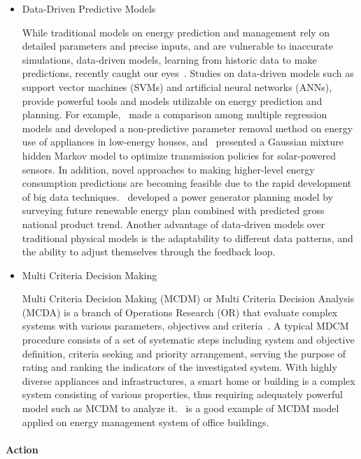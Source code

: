 \documentclass[letterpaper, twocolumn, 10pt, conference]{IEEEtran}
\begin{document}
\begin{itemize}

\item Data-Driven Predictive Models


While traditional models on energy prediction and management rely on detailed parameters and precise inputs, and are vulnerable to inaccurate simulations, data-driven models, learning from historic data to make predictions, recently caught our eyes~\cite{amasyali2018review}. Studies on data-driven models such as support vector machines (SVMs) and artificial neural networks (ANNs), provide powerful tools and models utilizable on energy prediction and planning. For example,~\cite{candanedo2017data} made a comparison among multiple regression models and developed a non-predictive parameter removal method on energy use of appliances in low-energy houses, and~\cite{ku2015data} presented a Gaussian mixture hidden Markov model to optimize transmission policies for solar-powered sensors. In addition, novel approaches to making higher-level energy consumption predictions are becoming feasible due to the rapid development of big data techniques.~\cite{zhou2016big} developed a power generator planning model by surveying future renewable energy plan combined with predicted gross national product trend. Another advantage of data-driven models over traditional physical models is the adaptability to different data patterns, and the ability to adjust themselves through the feedback loop.

\item Multi Criteria Decision Making

Multi Criteria Decision Making (MCDM) or Multi Criteria Decision Analysis (MCDA) is a branch of Operations Research (OR) that evaluate complex systems with various parameters, objectives and criteria~\cite{kumar2017review}. A typical MDCM procedure consists of a set of systematic steps including system and objective definition, criteria seeking and priority arrangement, serving the purpose of rating and ranking the indicators of the investigated system. With highly diverse appliances and infrastructures, a smart home or building is a complex system consisting of various properties, thus requiring adequately powerful model such as MCDM to analyze it.~\cite{roulet2002orme} is a good example of MCDM model applied on energy management system of office buildings.


\end{itemize}

\paragraph{Action}
\end{document}
